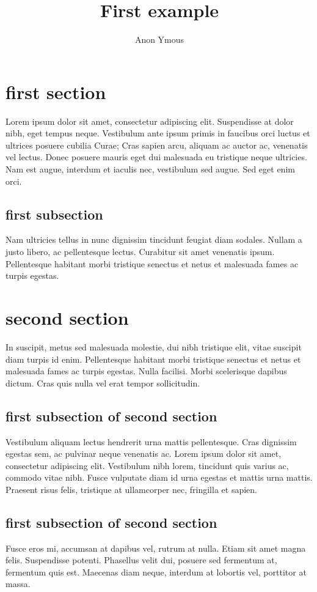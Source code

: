 \documentclass{article}
\title{First example}
\author{Anon Ymous}
\begin{document}
\maketitle

\section{first section}

Lorem ipsum dolor sit amet, consectetur adipiscing elit. Suspendisse at dolor
nibh, eget tempus neque. Vestibulum ante ipsum primis in faucibus orci luctus
et ultrices posuere cubilia Curae; Cras sapien arcu, aliquam ac auctor ac,
venenatis vel lectus. Donec posuere mauris eget dui malesuada eu tristique
neque ultricies. Nam est augue, interdum et iaculis nec, vestibulum sed augue.
Sed eget enim orci.


\subsection{first subsection}

Nam ultricies tellus in nunc dignissim tincidunt feugiat diam sodales. Nullam a
justo libero, ac pellentesque lectus. Curabitur sit amet venenatis ipsum.
Pellentesque habitant morbi tristique senectus et netus et malesuada fames ac
turpis egestas.


\section{second section}

In suscipit, metus sed malesuada molestie, dui nibh tristique elit, vitae
suscipit diam turpis id enim. Pellentesque habitant morbi tristique senectus et
netus et malesuada fames ac turpis egestas. Nulla facilisi. Morbi scelerisque
dapibus dictum. Cras quis nulla vel erat tempor sollicitudin.


\subsection{first subsection of second section}

Vestibulum aliquam lectus hendrerit urna mattis pellentesque. Cras dignissim
egestas sem, ac pulvinar neque venenatis ac. Lorem ipsum dolor sit amet,
consectetur adipiscing elit. Vestibulum nibh lorem, tincidunt quis varius ac,
commodo vitae nibh. Fusce vulputate diam id urna egestas et mattis urna mattis.
Praesent risus felis, tristique at ullamcorper nec, fringilla et sapien.


\subsection{first subsection of second section}

Fusce eros mi, accumsan at dapibus vel, rutrum at nulla. Etiam sit amet magna felis. Suspendisse potenti. Phasellus velit dui, posuere sed fermentum at, fermentum quis est. Maecenas diam neque, interdum at lobortis vel, porttitor at massa.
\end{document}
